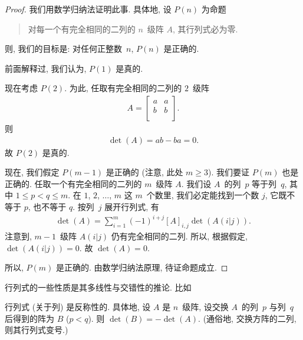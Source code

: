 \begin{proof}
    我们用数学归纳法证明此事.
    具体地, 设 \(P(n)\) 为命题
    \begin{quotation}
        对每一个有完全相同的二列的 \(n\)~级阵 \(A\),
        其行列式必为零.
    \end{quotation}
    则, 我们的目标是:
    对任何正整数~\(n\), \(P(n)\) 是正确的.

    前面解释过, 我们认为, \(P(1)\) 是真的.

    现在考虑 \(P(2)\).
    为此, 任取有完全相同的二列的 \(2\)~级阵
    \begin{align*}
        A = \begin{bmatrix}
                a & a \\
                b & b \\
            \end{bmatrix}.
    \end{align*}
    则
    \begin{align*}
        \det {(A)}
        = ab - ba
        = 0.
    \end{align*}
    故 \(P(2)\) 是真的.

    现在, 我们假定 \(P(m-1)\) 是正确的
    (注意, 此处 \(m \geq 3\)).
    我们要证 \(P(m)\) 也是正确的.
    任取一个有完全相同的二列的 \(m\)~级阵 \(A\).
    我们设 \(A\)~的列~\(p\) 等于列~\(q\),
    其中 \(1 \leq p < q \leq m\).
    在 \(1\), \(2\), \(\dots\), \(m\) 这 \(m\)~个数里,
    我们必定能找到一个数 \(j\),
    它既不等于 \(p\), 也不等于 \(q\).
    按列~\(j\) 展开行列式, 有
    \begin{align*}
        \det {(A)}
        = \sum_{i = 1}^{m} {(-1)^{i + j} [A]_{i,j}
        \det {(A(i|j))}}.
    \end{align*}
    注意到, \(m-1\)~级阵 \(A(i|j)\) 仍有完全相同的二列.
    所以, 根据假定, \(\det {(A(i|j))} = 0\).
    故 \(\det {(A)} = 0\).

    所以, \(P(m)\) 是正确的.
    由数学归纳法原理, 待证命题成立.
\end{proof}

行列式的一些性质是其多线性与交错性的推论.
比如

\begin{theorem}[反称性]
    行列式 (关于列) 是反称性的.
    具体地,
    设 \(A\) 是 \(n\)~级阵,
    设交换 \(A\)~的列~\(p\) 与列~\(q\) 后得到的阵为 \(B\)
    (\(p < q\)).
    则 \(\det {(B)} = -\det {(A)}\).
    (通俗地, 交换方阵的二列, 则其行列式变号.)
\end{theorem}

